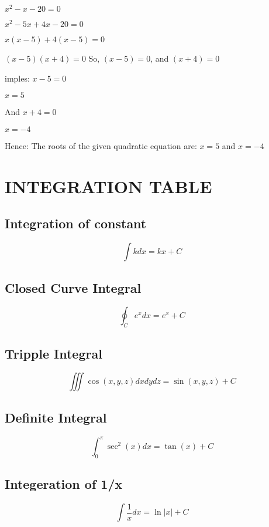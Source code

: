 \documentclass{article}
\begin{document}
$x^2-x-20=0$

$x^2-5x+4x-20=0$

$x(x-5)+4(x-5)=0$

$(x-5)(x+4)=0$
So, 
$(x-5) =0$, and $(x+4) =0$

imples:
$x-5 = 0$

$x = 5$

And $ x+4 = 0$

$x =-4$

Hence:
The roots of the given quadratic equation are:
$x=5$ and $ x=-4$

\section{INTEGRATION TABLE}

\subsection{Integration of constant}
\begin{equation*}
	\int k  dx = kx + C
\end{equation*}

\subsection{Closed Curve Integral}
\begin{equation*}
	\oint_C e^x dx = e^x + C
\end{equation*}

\subsection{Tripple Integral}
\begin{equation*}
	\iiint \cos(x,y,z) dx dy dz = \sin(x,y,z) + C
\end{equation*}

\subsection{Definite Integral}
\begin{equation*}
	\int_0^{\pi} \sec^2(x) dx = \tan(x) + C
\end{equation*}

\subsection{Integeration of 1/x}
\begin{equation*}
	\int \frac{1}{x} dx = \ln |x| + C
\end{equation*}
\end{document}
